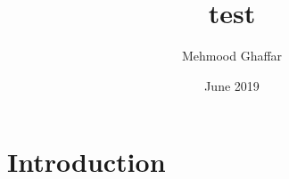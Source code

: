 \documentclass{article}
\title{test}
\author{Mehmood Ghaffar}
\date{June 2019}
\begin{document}
\maketitle

\section{Introduction}
\end{document}
